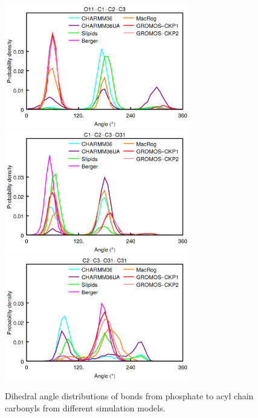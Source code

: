 \documentclass[aps,prl,superscriptaddress,twocolumn]{revtex4}
\begin{document}
\begin{figure}[]
  \includegraphics[width=8.0cm]{../Figs/diheds_pops5.png}
  \includegraphics[width=8.0cm]{../Figs/diheds_pops6.png}
  \includegraphics[width=8.0cm]{../Figs/diheds_pops7.png}
  \caption{\label{dihedralsGLY}
    Dihedral angle distributions of bonds from phosphate to acyl chain carbonyls from different simulation models.
  }
\end{figure}
\end{document}
